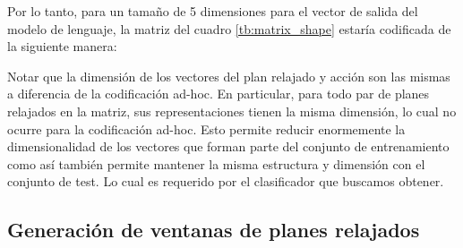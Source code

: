 Por lo tanto, para un tamaño de 5 dimensiones para el vector de salida del
modelo de lenguaje, la matriz del cuadro \ref{tb:matrix_shape} estaría
codificada de la siguiente manera:

\begin{table}[h!]
\centering
{}
 \caption{Ejemplos etiquetados a partir de un plan relajado y una acción}
\end{table}

Notar que la dimensión de los vectores del plan relajado y acción son las mismas
a diferencia de la codificación ad-hoc. En particular, para todo par de planes
relajados en la matriz, sus representaciones tienen la misma dimensión, lo cual
no ocurre para la codificación ad-hoc. Esto permite reducir enormemente la
dimensionalidad de los vectores que forman parte del conjunto de entrenamiento
como así también permite mantener la misma estructura y dimensión con el
conjunto de test. Lo cual es requerido por el clasificador que buscamos obtener.

\subsection{Generación de ventanas de planes relajados}

